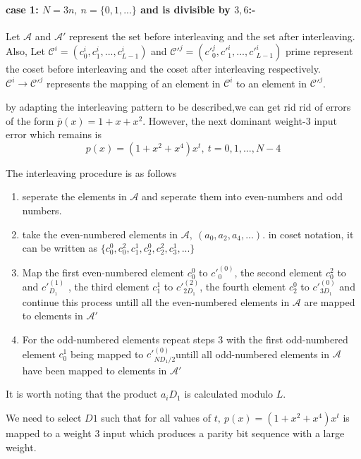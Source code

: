 \documentclass[11pt, oneside, dvipdfmx]{book}
\begin{document}
 \paragraph{case 1: $N=3n,~n=\{0,1,...\}$ and is divisible by $3,6$:-}
 Let $\mathcal{A}$ and $\mathcal{A}'$ represent the set before interleaving and the set after interleaving. Also, Let $\mathcal{C}^{i}=(c^i_0,c^i_1,...,c^i_{L-1})$ and $\mathcal{C}'^{j}=(c'^j_0,c'^i_1,...,c'^i_{L-1})$ prime represent the coset before interleaving and the coset after interleaving respectively. $\mathcal{C}^{i} \rightarrow \mathcal{C}'^{j}$ represents the mapping of an element in $\mathcal{C}^{i}$ to an element in $\mathcal{C}'^{j}$.
 
by adapting the interleaving pattern to be described,we can get rid rid of errors of the form $\bar{p}(x)=1+x+x^2$. However, the next dominant weight-$3$ input error which remains is
 \begin{equation}
 p(x)=(1+x^2+x^4)x^t,~t=0,1,...,N-4
 \end{equation}
 
The interleaving procedure is as follows
 \begin{enumerate}
 \item seperate the elements in $\mathcal{A}$ and seperate them into even-numbers and odd numbers. 
 
 \item take the even-numbered elements in $\mathcal{A},~(a_0,a_2,a_4,...)$. in coset notation, it can be written as $\{c^0_0,c^2_0,c^1_1,c^0_2,c^2_2,c^1_3,...   \}$
 
 \item Map the first even-numbered element $c^0_0$ to $c'^{(0)}_0$, the second element $c^2_0$ to and $c'^{(1)}_{D_1}$ , the third element $c^1_1$ to $c'^{(2)}_{2D_1}$, the fourth element $c^0_2$ to $c'^{(0)}_{3D_1}$ and continue this process untill all the even-numbered elements in $\mathcal{A}$ are mapped to elements in $\mathcal{A}'$
 
 \item For the odd-numbered elements repeat steps $3$ with the first odd-numbered element $c^1_0$ being mapped to  $c'^{(0)}_{ND_1/2}$untill all odd-numbered elements in $\mathcal{A}$ have been mapped to elements in $\mathcal{A}'$
 
 \end{enumerate}
 It is worth noting that the product $a_iD_1$ is calculated modulo $L$.
  
 We need to select $D1$ such that for all values of $t,~ p(x)=(1+x^2+x^4)x^t$ is mapped to a weight $3$ input which produces a parity bit sequence with a large weight.
 
\end{document}
